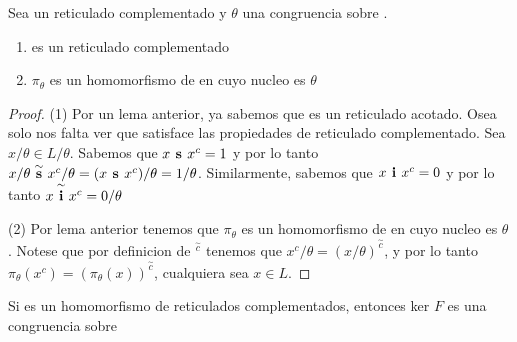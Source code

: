   \begin{lemma}
    Sea \reticulCompl un reticulado complementado y $\theta$ una congruencia sobre \reticulCompl.
    \begin{enumerate}
      \item {} es un reticulado complementado
      \item $\pi_\theta$ es un homomorfismo de \reticulCompl en  cuyo nucleo es $\theta$
    \end{enumerate}
  \end{lemma}
  \begin{proof}
    (1) Por un lema anterior, ya sabemos que  es un reticulado acotado.
    Osea solo nos falta ver que  satisface las propiedades de reticulado complementado.
    Sea $x/\theta \in L/\theta$. Sabemos que $x\textbf{ s }x^c = 1$ y por lo tanto $x/\theta\overset{\sim}{\textbf{ s }}x^c/\theta = (x\textbf{ s }x^c)/\theta = 1/\theta$.
    Similarmente, sabemos que $x\textbf{ i }x^c = 0$ y por lo tanto $x\overset{\sim}{\textbf{ i }}x^c = 0/\theta$

    (2) Por lema anterior tenemos que $\pi_\theta$ es un homomorfismo de \reticulAcot en  cuyo nucleo es $\theta$.
    Notese que por definicion de ${}^{\overset{\sim}{c}}$ tenemos que $x^c/\theta = (x/\theta)^{\overset{\sim}{c}}$, y por lo tanto $\pi_\theta(x^c) = (\pi_\theta(x))^{\overset{\sim}{c}}$,
    cualquiera sea $x \in L$.

  \end{proof}

  \begin{lemma}
    Si  es un homomorfismo de
    reticulados complementados, entonces ker $F$ es una congruencia sobre \reticulCompl
  \end{lemma}
  \noproof
